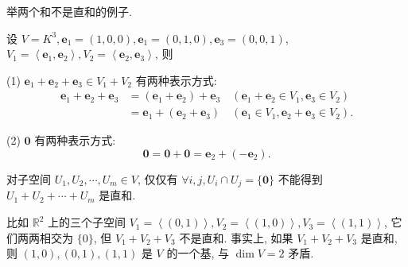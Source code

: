 \documentclass[color=black,device=normal,lang=cn,mode=geye]{elegantnote}
\begin{document}
举两个和不是直和的例子.
\begin{example}
    设 $V=K^3,\boldsymbol{e}_1=(1,0,0),\boldsymbol{e}_1=(0,1,0),\boldsymbol{e}_3=(0,0,1)$, $V_1=\left<\boldsymbol{e}_1,\boldsymbol{e}_2\right>,V_2=\left<\boldsymbol{e}_2,\boldsymbol{e}_3\right>$, 则
    
    (1) $\boldsymbol{e}_1+\boldsymbol{e}_2+\boldsymbol{e}_3\in V_1+V_2$ 有两种表示方式:
    \begin{align*}
        \boldsymbol{e}_1+\boldsymbol{e}_2+\boldsymbol{e}_3 & =(\boldsymbol{e}_1+\boldsymbol{e}_2)+\boldsymbol{e}_3\quad(\boldsymbol{e}_1+\boldsymbol{e}_2\in V_1,\boldsymbol{e}_3\in V_2) \\
        & =\boldsymbol{e}_1+(\boldsymbol{e}_2+\boldsymbol{e}_3)\quad(\boldsymbol{e}_1\in V_1,\boldsymbol{e}_2+\boldsymbol{e}_3\in V_2).
    \end{align*}

    (2) $\boldsymbol{0}$ 有两种表示方式:
    \[\boldsymbol{0}=\boldsymbol{0}+\boldsymbol{0}=\boldsymbol{e}_2+(-\boldsymbol{e}_2).\]
\end{example}
\begin{example}
    对子空间 $U_1,U_2,\cdots,U_m\in V$, 仅仅有 $\forall i,j,U_i\cap U_j=\{\boldsymbol{0}\}$ 不能得到 $U_1+U_2+\cdots+U_m$ 是直和.

    比如 $\mathbb{R}^2$ 上的三个子空间 $V_1=\left<(0,1)\right>,V_2=\left<(1,0)\right>,V_3=\left<(1,1)\right>$, 它们两两相交为 $\{0\}$, 但 $V_1+V_2+V_3$ 不是直和. 事实上, 如果 $V_1+V_2+V_3$ 是直和, 则 $(1,0),(0,1),(1,1)$ 是 $V$ 的一个基, 与 $\dim V=2$ 矛盾. 
\end{example}
\end{document}
